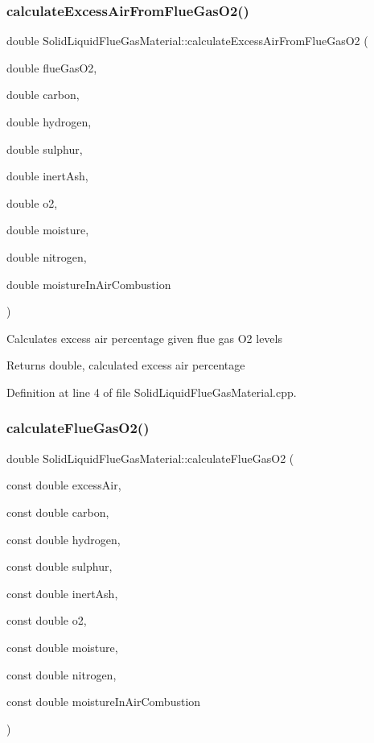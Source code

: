 \subsubsection{\texorpdfstring{calculate\+Excess\+Air\+From\+Flue\+Gas\+O2()}{calculateExcessAirFromFlueGasO2()}}
{\footnotesize\ttfamily double Solid\+Liquid\+Flue\+Gas\+Material\+::calculate\+Excess\+Air\+From\+Flue\+Gas\+O2 (\begin{DoxyParamCaption}\item[{double}]{flue\+Gas\+O2,  }\item[{double}]{carbon,  }\item[{double}]{hydrogen,  }\item[{double}]{sulphur,  }\item[{double}]{inert\+Ash,  }\item[{double}]{o2,  }\item[{double}]{moisture,  }\item[{double}]{nitrogen,  }\item[{double}]{moisture\+In\+Air\+Combustion }\end{DoxyParamCaption})\hspace{0.3cm}{\ttfamily [static]}}

Calculates excess air percentage given flue gas O2 levels \begin{DoxyReturn}{Returns}
double, calculated excess air percentage 
\end{DoxyReturn}


Definition at line 4 of file Solid\+Liquid\+Flue\+Gas\+Material.\+cpp.

\mbox{\label{class_solid_liquid_flue_gas_material_ae299abc71cd64822ad05af1a9b1a2ec1}} 
\subsubsection{\texorpdfstring{calculate\+Flue\+Gas\+O2()}{calculateFlueGasO2()}}
{\footnotesize\ttfamily double Solid\+Liquid\+Flue\+Gas\+Material\+::calculate\+Flue\+Gas\+O2 (\begin{DoxyParamCaption}\item[{const double}]{excess\+Air,  }\item[{const double}]{carbon,  }\item[{const double}]{hydrogen,  }\item[{const double}]{sulphur,  }\item[{const double}]{inert\+Ash,  }\item[{const double}]{o2,  }\item[{const double}]{moisture,  }\item[{const double}]{nitrogen,  }\item[{const double}]{moisture\+In\+Air\+Combustion }\end{DoxyParamCaption})\hspace{0.3cm}{\ttfamily [static]}}

